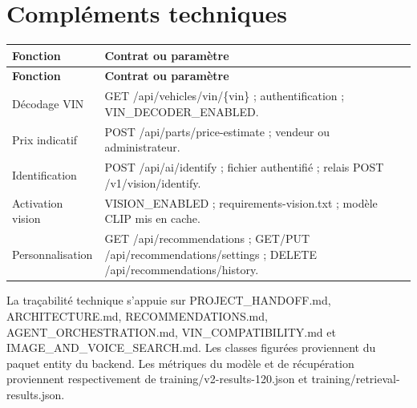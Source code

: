 \chapter{Compléments techniques}

{\small\singlespacing{}
\begin{longtable}{|>{\raggedright\arraybackslash}p{}|>{\raggedright\arraybackslash}p{}|}
\hline
\rowcolor{tablehead} \color{white}\bfseries Fonction & \color{white}\bfseries Contrat ou paramètre \\ \hline
\endfirsthead
\rowcolor{tablehead} \color{white}\bfseries Fonction & \color{white}\bfseries Contrat ou paramètre \\ \hline
\endhead
\hline\endfoot
Décodage VIN & GET /api/vehicles/vin/\{vin\} ; authentification ; VIN\_DECODER\_ENABLED. \\ \hline
\rowcolor{tablerow} Prix indicatif & POST /api/parts/price-estimate ; vendeur ou administrateur. \\ \hline
Identification & POST /api/ai/identify ; fichier authentifié ; relais POST /v1/vision/identify. \\ \hline
\rowcolor{tablerow} Activation vision & VISION\_ENABLED ; requirements-vision.txt ; modèle CLIP mis en cache. \\ \hline
Personnalisation & GET /api/recommendations ; GET/PUT /api/recommendations/settings ; DELETE /api/recommendations/history. \\ \hline
\end{longtable}
}


La traçabilité technique s'appuie sur PROJECT\_HANDOFF.md, ARCHITECTURE.md, RECOMMENDATIONS.md, AGENT\_ORCHESTRATION.md, VIN\_COMPATIBILITY.md et IMAGE\_AND\_VOICE\_SEARCH.md. Les classes figurées proviennent du paquet entity du backend. Les métriques du modèle et de récupération proviennent respectivement de training/v2-results-120.json et training/retrieval-results.json.
